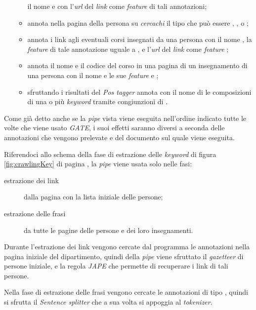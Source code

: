 \documentclass[tesi.tex]{subfiles}
\begin{document}
\begin{enumerate}
\begin{itemize}
    il nome  e con l'\emph{url} del \emph{link} come
    \emph{feature}  di tali annotazioni;
  \item {} annota nella pagina della persona su
    \emph{cercachi} il tipo che pu\`o essere ,
    , o ;
  \item {} annota i link agli eventuali corsi
    insegnati da una persona con il nome , la
    \emph{feature} di tale annotazione  uguale a
    , e l'\emph{url} del \emph{link} come
    \emph{feature} ;
  \item {} annota il nome e il codice del corso in
    una pagina di un insegnamento di una persona con il nome
     e le sue \emph{feature}  e ;
  \item {} sfruttando i risultati del \emph{Pos
    tagger} annota con il nome di  le composizioni di una o pi\`u \emph{keyword} tramite
    congiunzioni di .
  \end{itemize}
\end{enumerate}

Come gi\`a detto anche se la \emph{pipe} vista viene eseguita
nell'ordine indicato tutte le volte che viene usato \emph{GATE}, i
suoi effetti saranno diversi a seconda delle annotazioni che vengono
prelevate e del documento sul quale viene eseguita.

Riferendoci allo schema della fase di estrazione delle \emph{keyword}
di figura \ref{fig:crawlingKey} di pagina
\pageref{fig:crawlingKey}, la \emph{pipe}
 viene usata solo nelle fasi:
\begin{description}
\item[estrazione dei link] dalla pagina con la lista iniziale delle persone;
\item[estrazione delle frasi] da tutte le pagine delle persone e dei
  loro insegnamenti.
\end{description}
Durante l'estrazione dei link vengono cercate dal programma le
annotazioni  nella pagina iniziale del
dipartimento, quindi della \emph{pipe} viene sfruttato il
\emph{gazetteer} di persone iniziale, e la regola \emph{JAPE} che
permette di recuperare i link di tali persone.

Nella fase di estrazione delle frasi vengono cercate le annotazioni di
tipo , quindi si sfrutta il \emph{Sentence splitter}
che a sua volta si appoggia al \emph{tokenizer}.
\end{document}
